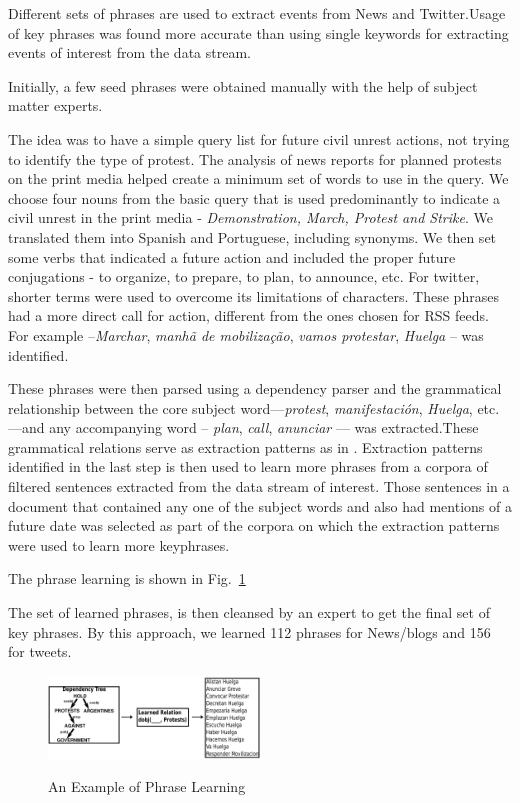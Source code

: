 Different sets of phrases are used to extract events from News and Twitter.Usage of key phrases was found more accurate than using single keywords for extracting events of interest from the data stream.

Initially, a few seed phrases were obtained manually
with the help of subject matter experts.


The idea was to have a simple query list for future civil unrest actions, not trying to identify the type of protest. The analysis of news reports for planned protests on the print media helped create a minimum set of words to use in the query.
We choose four nouns from the basic query that is used predominantly to indicate a civil unrest in the print media - {\em Demonstration, March, Protest and Strike}. We translated them into Spanish and Portuguese, including synonyms.
We then set some verbs that indicated a future action and included the proper future conjugations - to organize, to prepare, to plan, to announce, etc. For twitter, shorter terms were used to overcome its limitations of characters. These phrases had a more direct call for action, different from the ones chosen for RSS feeds. For example --{\em Marchar}, {\em manhã de mobilização}, {\em vamos  protestar}, {\em Huelga} -- was identified.

These phrases were then parsed
using a dependency parser \cite{freeling} and the grammatical relationship between the
core subject word---{\em protest}, {\em manifestación}, {\em Huelga},
etc.---and any accompanying word -- {\em plan}, {\em call}, {\em anunciar} --- was extracted.These grammatical relations serve as extraction patterns as in \cite{riloff2003learning}. 
Extraction patterns identified in the last step is then used to learn more phrases from a corpora of filtered sentences extracted from the data stream of interest. Those sentences in a document that contained any one of the subject words and also had mentions of a future date was selected as part of the corpora on which the extraction patterns were used to learn more keyphrases.

The phrase learning is shown in Fig.~\ref{fig:phraselearning}

The set of learned phrases, is then cleansed by an expert to get the final set of key phrases.
By this approach, we learned 112 phrases for News/blogs and 156 for tweets.

\begin{figure}
\caption{An Example of Phrase Learning}
\includegraphics[width=0.5\textwidth]{figures/phraseLearning}
\label{fig:phraselearning}
\end{figure}
